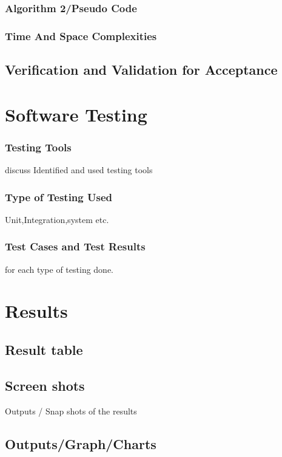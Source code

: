 \documentclass[12pt,a4paper]{article}
\begin{document}
  \subsubsection{Algorithm 2/Pseudo Code}
  \subsubsection{Time And Space Complexities}
  \subsection{Verification and Validation for Acceptance}
  

\section{Software Testing}
\setcounter{section}{10}
\subsubsection{Testing Tools }
     discuss  Identified and used testing tools
 \subsubsection{Type of Testing Used}
   Unit,Integration,system etc.
   \subsubsection{Test Cases and Test Results}
   for each type of testing done.    
   
   

\section{Results}
\setcounter{section}{11}
\subsection{Result table}
\subsection{Screen shots}
Outputs / Snap shots of the results
\subsection{Outputs/Graph/Charts}
\end{document}
